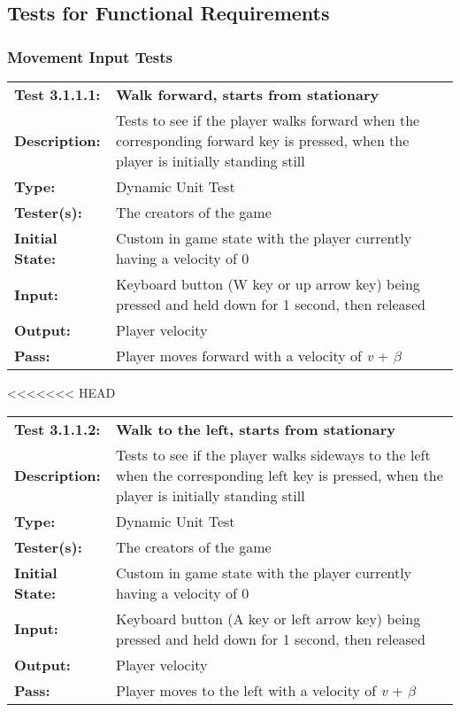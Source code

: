 \documentclass[12pt, titlepage]{article}
\begin{document}
\subsection{Tests for Functional Requirements}
\subsubsection{Movement Input Tests}

\begin{mdframed}[linewidth=1pt]
\begin{tabularx}{\textwidth}{@{}p{3cm}X@{}}
{\bf Test 3.1.1.1:} & {\bf Walk forward, starts from stationary}\\[\baselineskip]
{\bf Description:} & Tests to see if the player walks forward when the corresponding forward key is pressed, when the player is initially standing still\\[0.5\baselineskip]
{\bf Type:} & Dynamic Unit Test\\[0.5\baselineskip]
{\bf Tester(s):} & The creators of the game\\[0.5\baselineskip]
{\bf Initial State:} & Custom in game state with the player currently having a velocity of 0\\[0.5\baselineskip]
{\bf Input:} & Keyboard button (W key or up arrow key) being pressed and held down for 1 second, then released\\[0.5\baselineskip]
{\bf Output:} & Player velocity\\[0.5\baselineskip]
{\bf Pass:} & Player moves forward with a velocity of \textit{v} + $\beta$
\end{tabularx}
\end{mdframed}
<<<<<<< HEAD
					
\begin{mdframed}[linewidth=1pt]
\begin{tabularx}{\textwidth}{@{}p{3cm}X@{}}
{\bf Test 3.1.1.2:} & {\bf Walk to the left, starts from stationary}\\[\baselineskip]
{\bf Description:} & Tests to see if the player walks sideways to the left when the corresponding left key is pressed, when the player is initially standing still\\[0.5\baselineskip]
{\bf Type:} & Dynamic Unit Test\\[0.5\baselineskip]
{\bf Tester(s):} & The creators of the game\\[0.5\baselineskip]
{\bf Initial State:} & Custom in game state with the player currently having a velocity of 0\\[0.5\baselineskip]
{\bf Input:} & Keyboard button (A key or left arrow key) being pressed and held down for 1 second, then released\\[0.5\baselineskip]
{\bf Output:} & Player velocity\\[0.5\baselineskip]
{\bf Pass:} & Player moves to the left with a velocity of \textit{v} + $\beta$
\end{tabularx}
\end{mdframed}
\end{document}
